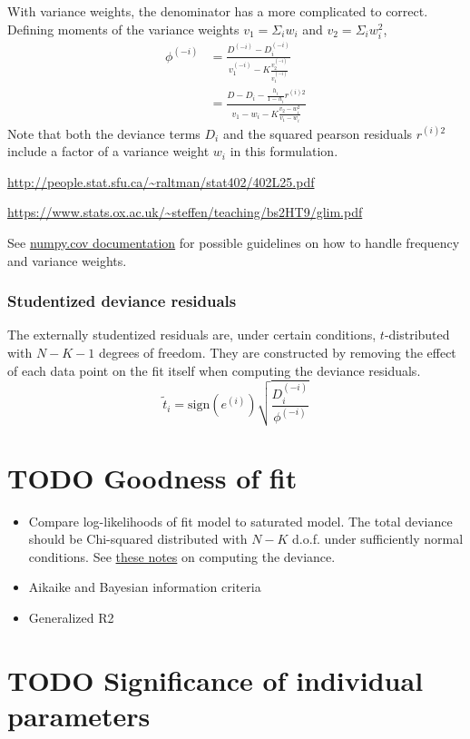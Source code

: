 \documentclass{article}
\begin{document}
With variance weights, the denominator has a more complicated to correct.
Defining moments of the variance weights $v_1 = \Sigma_i w_i$ and $v_2 = \Sigma_i w_i^2$,
\begin{align}
  \phi^{(-i)} &= \frac{D^{(-i)} - D_i^{(-i)}}{v_1^{(-i)} - K \frac{v_2^{(-i)}}{v_1^{(-i)}}} \\
              &= \frac{D - D_i - \frac{h_i}{1-h_i} r^{(i)2} }{v_1 - w_i - K \frac{v_2 - w_i^2}{v_1 - w_i}}
\end{align}
Note that both the deviance terms $D_i$ and the squared pearson residuals
$r^{(i)2}$ include a factor of a variance weight $w_i$ in this formulation.

\url{http://people.stat.sfu.ca/~raltman/stat402/402L25.pdf}

\url{https://www.stats.ox.ac.uk/~steffen/teaching/bs2HT9/glim.pdf}

See
\href{https://numpy.org/doc/stable/reference/generated/numpy.cov.html#numpy.cov}{numpy.cov
documentation} for possible guidelines on how to handle frequency and variance
weights.

\subsubsection{Studentized deviance residuals}
The externally studentized residuals are, under certain conditions,
$t$-distributed with $N-K-1$ degrees of freedom. They are constructed by
removing the effect of each data point on the fit itself when computing the
deviance residuals.
\[\tilde{t}_i = \mathrm{sign}(e^{(i)}) \sqrt{\frac{D_i^{(-i)}}{\phi^{(-i)}}} \]

\section{TODO Goodness of fit}

\begin{itemize}
\item Compare log-likelihoods of fit model to saturated model. The total
  deviance should be Chi-squared distributed with \(N -K\) d.o.f. under
  sufficiently normal conditions.
See \href{http://people.stat.sfu.ca/~raltman/stat402/402L11.pdf}{these notes} on computing the deviance.
\item Aikaike and Bayesian information criteria
\item Generalized R2
\end{itemize}

\section{TODO Significance of individual parameters}
\end{document}
